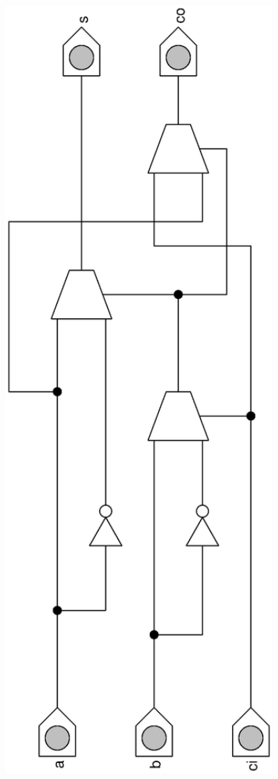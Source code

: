 \documentclass[a4paper,10pt]{scrartcl}
\begin{document}
\begin{enumerate}
\begin{enumerate}
        \vspace{-2.5cm}
            \includegraphics[angle=-90,width=0.8\textwidth]{mux2-addierer.eps}
        \vspace{-2.5cm}
    \end{enumerate}

\end{enumerate}
\end{document}
